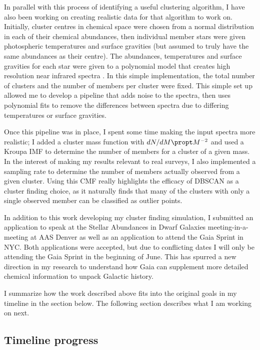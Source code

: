 \documentclass[11pt]{article}
\begin{document}
    In parallel with this process of identifying a useful clustering algorithm, I have also been working on creating realistic data for that algorithm to work on. Initially, cluster centres in chemical space were chosen from a normal distribution in each of their chemical abundances, then individual member stars were given photospheric temperatures and surface gravities (but assumed to truly have the same abundances as their centre). The abundances, temperatures and surface gravities for each star were given to a polynomial model that creates high resolution near infrared spectra \citep{Rix2016}. In this simple implementation, the total number of clusters and the number of members per cluster were fixed. This simple set up allowed me to develop a pipeline that adds noise to the spectra, then uses polynomial fits to remove the differences between spectra due to differing temperatures or surface gravities.
    
    Once this pipeline was in place, I spent some time making the input spectra more realistic; I added a cluster mass function with $dN/dM\propt M^{-2}$ and used a Kroupa IMF to determine the number of members for a cluster of a given mass. In the interest of making my results relevant to real surveys, I also implemented a sampling rate to determine the number of members actually observed from a given cluster. Using this CMF really highlights the efficacy of DBSCAN as a cluster finding choice, as it naturally finds that many of the clusters with only a single observed member can be classified as outlier points.
    
    In addition to this work developing my cluster finding simulation, I submitted an application to speak at the Stellar Abundances in Dwarf Galaxies meeting-in-a-meeting at AAS Denver as well as an application to attend the Gaia Sprint in NYC. Both applications were accepted, but due to conflicting dates I will only be attending the Gaia Sprint in the beginning of June. This has spurred a new direction in my research to understand how Gaia can supplement more detailed chemical information to unpack Galactic history.
    
    I summarize how the work described above fits into the original goals in my timeline in the section below. The following section describes what I am working on next.
    
    
        \subsection*{Timeline progress}
    
\end{document}
